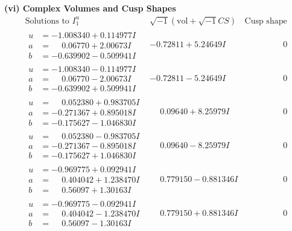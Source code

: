 \documentclass[1p]{elsarticle_modified}
\theoremstyle{definition}
\newcommand{\I}{\sqrt{-1}}
\begin{document}
\newpage\flushleft \textbf{(vi) Complex Volumes and Cusp Shapes}
$$\begin{array}{c|c|c}  
\text{Solutions to }I^u_{1}& \I (\text{vol} + \sqrt{-1}CS) & \text{Cusp shape}\\
 \hline 
\begin{aligned}
u &= -1.008340 + 0.114977 I \\
a &= \phantom{-}0.06770 + 2.00673 I \\
b &= -0.639902 - 0.509941 I\end{aligned}
 & -0.72811 + 5.24649 I & \phantom{-0.000000 } 0 \\ \hline\begin{aligned}
u &= -1.008340 - 0.114977 I \\
a &= \phantom{-}0.06770 - 2.00673 I \\
b &= -0.639902 + 0.509941 I\end{aligned}
 & -0.72811 - 5.24649 I & \phantom{-0.000000 } 0 \\ \hline\begin{aligned}
u &= \phantom{-}0.052380 + 0.983705 I \\
a &= -0.271367 + 0.895018 I \\
b &= -0.175627 - 1.046830 I\end{aligned}
 & \phantom{-}0.09640 + 8.25979 I & \phantom{-0.000000 } 0 \\ \hline\begin{aligned}
u &= \phantom{-}0.052380 - 0.983705 I \\
a &= -0.271367 - 0.895018 I \\
b &= -0.175627 + 1.046830 I\end{aligned}
 & \phantom{-}0.09640 - 8.25979 I & \phantom{-0.000000 } 0 \\ \hline\begin{aligned}
u &= -0.969775 + 0.092941 I \\
a &= \phantom{-}0.404042 + 1.238470 I \\
b &= \phantom{-}0.56097 + 1.30163 I\end{aligned}
 & \phantom{-}0.779150 - 0.881346 I & \phantom{-0.000000 } 0 \\ \hline\begin{aligned}
u &= -0.969775 - 0.092941 I \\
a &= \phantom{-}0.404042 - 1.238470 I \\
b &= \phantom{-}0.56097 - 1.30163 I\end{aligned}
 & \phantom{-}0.779150 + 0.881346 I & \phantom{-0.000000 } 0 \\ \hline\begin{aligned}

\end{aligned}
\end{array}$$
\end{document}
